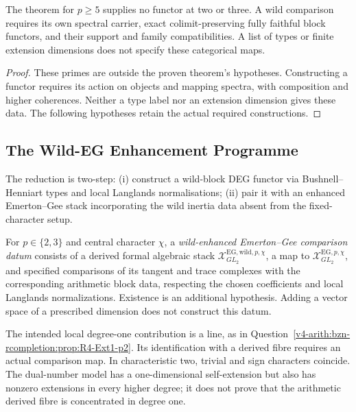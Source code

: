 \begin{proposition}
\label{v4-arith:deg-f1a:prop:DEG-wild-obs}
The theorem for \(p\ge5\) supplies no functor at two or three.
A wild comparison requires its own spectral carrier, exact
colimit-preserving fully faithful block functors, and their
support and family compatibilities. A list of types or finite
extension dimensions does not specify these categorical maps.
\end{proposition}
\begin{proof}
These primes are outside the proven theorem's hypotheses.
Constructing a functor requires its action on objects and mapping
spectra, with composition and higher coherences. Neither a type
label nor an extension dimension gives these data. The following
hypotheses retain the actual required constructions.
\end{proof}

\subsection{The Wild-EG Enhancement Programme}

The reduction is two-step: (i) construct a wild-block DEG functor
via Bushnell--Henniart types and local Langlands normalisations;
(ii) pair it with an enhanced Emerton--Gee stack incorporating the
wild inertia data absent from the fixed-character setup.

\begin{definition}
\label{v4-arith:deg-f1a:def:EG-wild-enhanced}
For \(p\in\{2,3\}\) and central character \(\chi\), a
\emph{wild-enhanced Emerton--Gee comparison datum} consists of a
derived formal algebraic stack
\(\mathcal X^{\mathrm{EG,wild},p,\chi}_{GL_2}\), a map to
\(\mathcal X^{\mathrm{EG},p,\chi}_{GL_2}\), and specified comparisons
of its tangent and trace complexes with the corresponding arithmetic
block data, respecting the chosen coefficients and local Langlands
normalizations. Existence is an additional hypothesis. Adding a
vector space of a prescribed dimension does not construct this datum.
\end{definition}

\begin{remark}
\label{v4-arith:deg-f1a:rem:wild-EG-p2}
The intended local degree-one contribution is a line, as in
Question~\ref{v4-arith:bzn-rcompletion:prop:R4-Ext1-p2}.
Its identification with a derived fibre requires an actual comparison
map. In characteristic two, trivial and sign characters coincide.
The dual-number model has a one-dimensional self-extension but also
has nonzero extensions in every higher degree; it does not prove
that the arithmetic derived fibre is concentrated in degree one.
\end{remark}

